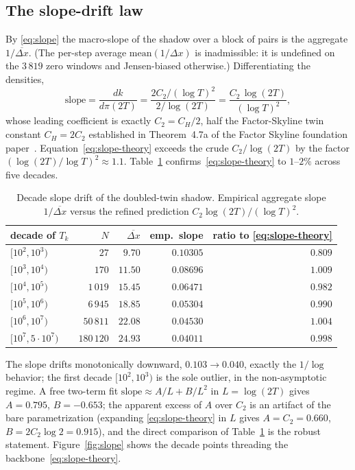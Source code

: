 \subsection{The slope-drift law}\label{sec:deltax-slope}

By \eqref{eq:slope} the macro-slope of the shadow over a block of pairs is the
aggregate $1/\overline{\Delta x}$. (The per-step average
$\mathrm{mean}(1/\Delta x)$ is inadmissible: it is undefined on the $3\,819$
zero windows and Jensen-biased otherwise.) Differentiating the densities,
\[
   \mathrm{slope}
   =\frac{dk}{d\pi(2T)}
   =\frac{2C_2/(\log T)^2}{2/\log(2T)}
   =\frac{C_2\,\log(2T)}{(\log T)^2},
\tag{$\ast\ast$}\label{eq:slope-theory}
\]
whose leading coefficient is exactly $C_2=C_H/2$, half the Factor-Skyline
twin constant $C_H=2C_2$ established in Theorem~4.7a of the Factor Skyline
foundation paper~\cite{FS1}. Equation~\eqref{eq:slope-theory} exceeds the
crude $C_2/\log(2T)$ by the factor $(\log(2T)/\log T)^2\approx 1.1$.
Table~\ref{tab:deltax-slope} confirms~\eqref{eq:slope-theory} to $1$--$2\%$
across five decades.

\begin{table}[h]
\centering
\caption{Decade slope drift of the doubled-twin shadow. Empirical aggregate
slope $1/\overline{\Delta x}$ versus the refined prediction
$C_2\log(2T)/(\log T)^2$.}\label{tab:deltax-slope}
\begin{tabular}{lrrrr}
\toprule
decade of $T_k$ & $N$ & $\overline{\Delta x}$ & emp.\ slope & ratio to \eqref{eq:slope-theory} \\
\midrule
$[10^2,10^3)$        & $27$       & $9.70$  & $0.10305$ & $0.809$ \\
$[10^3,10^4)$        & $170$      & $11.50$ & $0.08696$ & $1.009$ \\
$[10^4,10^5)$        & $1\,019$   & $15.45$ & $0.06471$ & $0.982$ \\
$[10^5,10^6)$        & $6\,945$   & $18.85$ & $0.05304$ & $0.990$ \\
$[10^6,10^7)$        & $50\,811$  & $22.08$ & $0.04530$ & $1.004$ \\
$[10^7,5\cdot10^7)$  & $180\,120$ & $24.93$ & $0.04011$ & $0.998$ \\
\bottomrule
\end{tabular}
\end{table}

The slope drifts monotonically downward, $0.103\to0.040$, exactly the $1/\log$
behavior; the first decade $[10^2,10^3)$ is the sole outlier, in the
non-asymptotic regime. A free two-term fit
$\mathrm{slope}\approx A/L+B/L^2$ in $L=\log(2T)$ gives $A=0.795$, $B=-0.653$;
the apparent excess of $A$ over $C_2$ is an artifact of the bare
parametrization (expanding \eqref{eq:slope-theory} in $L$ gives
$A=C_2=0.660$, $B=2C_2\log2=0.915$), and the direct comparison of
Table~\ref{tab:deltax-slope} is the robust statement. Figure~\ref{fig:slope}
shows the decade points threading the backbone~\eqref{eq:slope-theory}.

